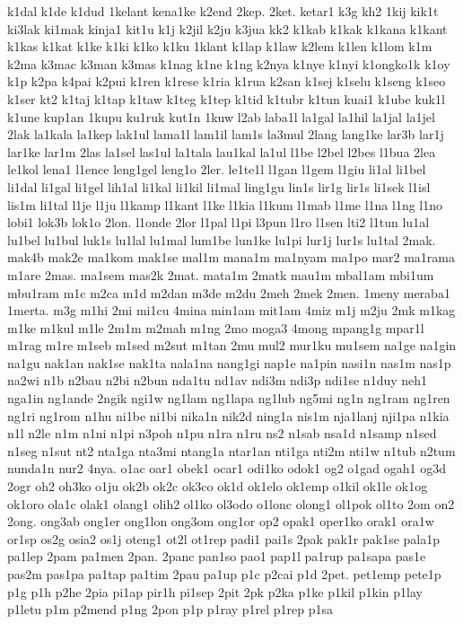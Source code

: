 k1dal
k1de
k1dud
1kelant
kena1ke
k2end
2kep.
2ket.
ketar1
k3g
kh2
1kij
kik1t
ki3lak
ki1mak
kinja1
kit1u
k1j
k2jil
k2ju
k3jua
kk2
k1kab
k1kak
k1kana
k1kant
k1kas
k1kat
k1ke
k1ki
k1ko
k1ku
1klant
k1lap
k1law
k2lem
k1len
k1lom
k1m
k2ma
k3mac
k3man
k3mas
k1nag
k1ne
k1ng
k2nya
k1nye
k1nyi
k1ongko1k
k1oy
k1p
k2pa
k4pai
k2pui
k1ren
k1rese
k1ria
k1rua
k2san
k1sej
k1selu
k1seng
k1seo
k1ser
kt2
k1taj
k1tap
k1taw
k1teg
k1tep
k1tid
k1tubr
k1tun
kuai1
k1ube
kuk1l
k1une
kup1an
1kupu
ku1ruk
kut1n
1kuw
l2ab
laba1l
la1gal
la1hil
la1jal
la1jel
2lak
la1kala
la1kep
lak1ul
lama1l
lam1il
lam1s
la3mul
2lang
lang1ke
lar3b
lar1j
lar1ke
lar1m
2las
la1sel
las1ul
la1tala
lau1kal
la1ul
l1be
l2bel
l2bes
l1bua
2lea
le1kol
lena1
l1ence
leng1gel
leng1o
2ler.
le1te1l
l1gan
l1gem
l1giu
li1al
li1bel
li1dal
li1gal
li1gel
lih1al
li1kal
li1kil
li1mal
ling1gu
lin1s
lir1g
lir1s
li1sek
l1isl
lis1m
li1tal
l1je
l1ju
l1kamp
l1kant
l1ke
l1kia
l1kum
l1mab
l1me
l1na
l1ng
l1no
lobi1
lok3b
lok1o
2lon.
l1onde
2lor
l1pal
l1pi
l3pun
l1ro
l1sen
lti2
l1tun
lu1al
lu1bel
lu1bul
luk1s
lu1lal
lu1mal
lum1be
lun1ke
lu1pi
lur1j
lur1s
lu1tal
2mak.
mak4b
mak2e
ma1kom
mak1se
mal1m
mana1m
ma1nyam
ma1po
mar2
ma1rama
m1are
2mas.
ma1sem
mas2k
2mat.
mata1m
2matk
mau1m
mbal1am
mbi1um
mbu1ram
m1c
m2ca
m1d
m2dan
m3de
m2du
2meh
2mek
2men.
1meny
meraba1
1merta.
m3g
m1hi
2mi
mi1cu
4mina
min1am
mit1am
4miz
m1j
m2ju
2mk
m1kag
m1ke
m1kul
m1le
2m1m
m2mah
m1ng
2mo
moga3
4mong
mpang1g
mpar1l
m1rag
m1re
m1seb
m1sed
m2sut
m1tan
2mu
mul2
mur1ku
mu1sem
na1ge
na1gin
na1gu
nak1an
nak1se
nak1ta
nala1na
nang1gi
nap1e
na1pin
nasi1n
nas1m
nas1p
na2wi
n1b
n2bau
n2bi
n2bun
nda1tu
nd1av
ndi3m
ndi3p
ndi1se
n1duy
neh1
nga1in
ng1ande
2ngik
ngi1w
ng1lam
ng1lapa
ng1lub
ng5mi
ng1n
ng1ram
ng1ren
ng1ri
ng1rom
n1hu
ni1be
ni1bi
nika1n
nik2d
ning1a
nis1m
nja1lanj
nji1pa
n1kia
n1l
n2le
n1m
n1ni
n1pi
n3poh
n1pu
n1ra
n1ru
ns2
n1sab
nsa1d
n1samp
n1sed
n1seg
n1sut
nt2
nta1ga
nta3mi
ntang1a
ntar1an
nti1ga
nti2m
nti1w
n1tub
n2tum
nunda1n
nur2
4nya.
o1ac
oar1
obek1
ocar1
odi1ko
odok1
og2
o1gad
ogah1
og3d
2ogr
oh2
oh3ko
o1ju
ok2b
ok2c
ok3co
ok1d
ok1elo
ok1emp
o1kil
ok1le
ok1og
ok1oro
ola1c
olak1
olang1
olih2
ol1ko
ol3odo
o1lonc
olong1
ol1pok
ol1to
2om
on2
2ong.
ong3ab
ong1er
ong1lon
ong3om
ong1or
op2
opak1
oper1ko
orak1
ora1w
or1sp
os2g
osia2
os1j
oteng1
ot2l
ot1rep
padi1
pai1s
2pak
pak1r
pak1se
pala1p
pa1lep
2pam
pa1men
2pan.
2panc
pan1so
pao1
pap1l
pa1rup
pa1sapa
pas1e
pas2m
pas1pa
pa1tap
pa1tim
2pau
pa1up
p1c
p2cai
p1d
2pet.
pet1emp
pete1p
p1g
p1h
p2he
2pia
pi1ap
pir1h
pi1sep
2pit
2pk
p2ka
p1ke
p1kil
p1kin
p1lay
p1letu
p1m
p2mend
p1ng
2pon
p1p
p1ray
p1rel
p1rep
p1sa
